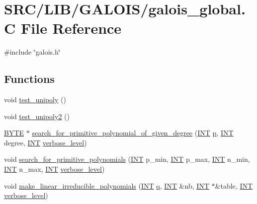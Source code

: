 \hypertarget{galois__global_8_c}{}\section{S\+R\+C/\+L\+I\+B/\+G\+A\+L\+O\+I\+S/galois\+\_\+global.C File Reference}
\label{galois__global_8_c}
{\ttfamily \#include \char`\"{}galois.\+h\char`\"{}}\newline
\subsection*{Functions}
\begin{DoxyCompactItemize}
\item 
void \mbox{\hyperlink{galois__global_8_c_a633245faf73ebcbc2f73276b03e0962b}{test\+\_\+unipoly}} ()
\item 
void \mbox{\hyperlink{galois__global_8_c_ac40335895fedd889545dad901ac470a6}{test\+\_\+unipoly2}} ()
\item 
\mbox{\hyperlink{galois_8h_ab6cc7b4aeb6ea31aba2b3fbfc83ff5e6}{B\+Y\+TE}} $\ast$ \mbox{\hyperlink{galois__global_8_c_a5f70384bd08b74ef6f9e0f8663d0f286}{search\+\_\+for\+\_\+primitive\+\_\+polynomial\+\_\+of\+\_\+given\+\_\+degree}} (\mbox{\hyperlink{galois_8h_a09fddde158a3a20bd2dcadb609de11dc}{I\+NT}} \mbox{\hyperlink{alphabet2_8_c_a533391314665d6bf1b5575e9a9cd8552}{p}}, \mbox{\hyperlink{galois_8h_a09fddde158a3a20bd2dcadb609de11dc}{I\+NT}} degree, \mbox{\hyperlink{galois_8h_a09fddde158a3a20bd2dcadb609de11dc}{I\+NT}} \mbox{\hyperlink{simeon_8_c_a818073fbcc2f439e7c56952f67386122}{verbose\+\_\+level}})
\item 
void \mbox{\hyperlink{galois__global_8_c_af553fd9220b115eb70f5557cdd6932ac}{search\+\_\+for\+\_\+primitive\+\_\+polynomials}} (\mbox{\hyperlink{galois_8h_a09fddde158a3a20bd2dcadb609de11dc}{I\+NT}} p\+\_\+min, \mbox{\hyperlink{galois_8h_a09fddde158a3a20bd2dcadb609de11dc}{I\+NT}} p\+\_\+max, \mbox{\hyperlink{galois_8h_a09fddde158a3a20bd2dcadb609de11dc}{I\+NT}} n\+\_\+min, \mbox{\hyperlink{galois_8h_a09fddde158a3a20bd2dcadb609de11dc}{I\+NT}} n\+\_\+max, \mbox{\hyperlink{galois_8h_a09fddde158a3a20bd2dcadb609de11dc}{I\+NT}} \mbox{\hyperlink{simeon_8_c_a818073fbcc2f439e7c56952f67386122}{verbose\+\_\+level}})
\item 
void \mbox{\hyperlink{galois__global_8_c_acf26a87efbf2d1f65cfe00e177cc9fc8}{make\+\_\+linear\+\_\+irreducible\+\_\+polynomials}} (\mbox{\hyperlink{galois_8h_a09fddde158a3a20bd2dcadb609de11dc}{I\+NT}} \mbox{\hyperlink{simeon_8_c_a92cbb483a3b27ae1a0dbfcb125ce216f}{q}}, \mbox{\hyperlink{galois_8h_a09fddde158a3a20bd2dcadb609de11dc}{I\+NT}} \&nb, \mbox{\hyperlink{galois_8h_a09fddde158a3a20bd2dcadb609de11dc}{I\+NT}} $\ast$\&table, \mbox{\hyperlink{galois_8h_a09fddde158a3a20bd2dcadb609de11dc}{I\+NT}} \mbox{\hyperlink{simeon_8_c_a818073fbcc2f439e7c56952f67386122}{verbose\+\_\+level}})

\end{DoxyCompactItemize}
